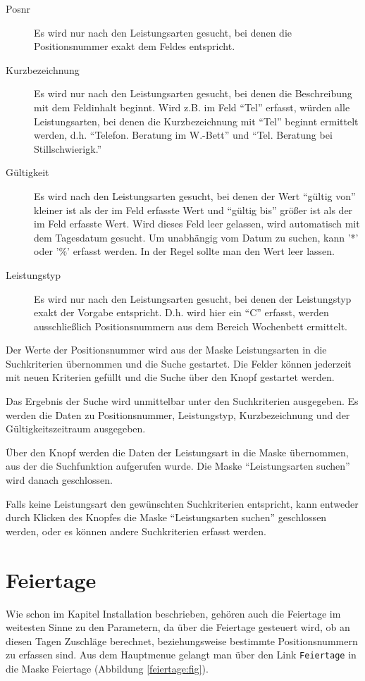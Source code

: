 \begin{description}
\item[Posnr] 
Es wird nur nach den Leistungsarten gesucht, bei denen die Positionsnummer
exakt dem Feldes entspricht.
\item[Kurzbezeichnung] 
Es wird nur nach den Leistungsarten gesucht, bei denen die
Beschreibung mit dem Feldinhalt beginnt. Wird z.B. im Feld 
 ``Tel'' erfasst,
würden alle Leistungsarten, bei denen die Kurzbezeichnung mit ``Tel'' beginnt 
ermittelt werden, d.h. ``Telefon. Beratung im W.-Bett'' und ``Tel. Beratung
bei Stillschwierigk.''
\item[Gültigkeit]
Es wird nach den Leistungsarten gesucht, bei denen der Wert ``gültig von''
kleiner ist als der im Feld   erfasste Wert und
``gültig bis'' größer ist als der im Feld  erfasste Wert.
Wird dieses Feld leer gelassen, wird automatisch mit dem Tagesdatum gesucht.
Um unabhängig vom Datum zu suchen, kann '*' oder '\%' erfasst werden.
In der Regel sollte man den Wert leer lassen.

\item[Leistungstyp] 
Es wird nur nach den Leistungsarten gesucht, bei denen der Leistungstyp
exakt der Vorgabe entspricht. D.h. wird hier ein ``C'' erfasst,
werden ausschließlich Positionsnummern aus dem Bereich Wochenbett
ermittelt.
\end{description}

Der Werte der Positionsnummer wird aus der Maske Leistungsarten
in die Suchkriterien übernommen und die Suche gestartet.
Die Felder können jederzeit mit neuen Kriterien gefüllt und die Suche
über den Knopf  gestartet werden.

Das Ergebnis der Suche wird unmittelbar unter den Suchkriterien ausgegeben.
Es werden die Daten zu Positionsnummer, Leistungstyp, Kurzbezeichnung und
der Gültigkeitszeitraum ausgegeben.

Über den Knopf  werden die Daten der Leistungsart in die Maske
übernommen, aus der die Suchfunktion aufgerufen wurde. Die Maske
``Leistungsarten suchen''
wird danach geschlossen.

Falls keine Leistungsart den gewünschten Suchkriterien entspricht, 
kann entweder
durch Klicken des Knopfes  die Maske ``Leistungsarten suchen''
geschlossen werden, oder es können andere Suchkriterien erfasst werden.




\section{Feiertage\label{feiertage:abs}}
Wie schon im Kapitel Installation beschrieben, gehören auch die Feiertage
im weitesten Sinne zu den Parametern, da über die Feiertage gesteuert
wird, ob an diesen Tagen Zuschläge berechnet, beziehungsweise bestimmte
Positionsnummern zu erfassen sind.
Aus dem Hauptmenue gelangt man über den Link \nolinkurl{Feiertage}
in die Maske Feiertage (Abbildung \vref{feiertage:fig}).

